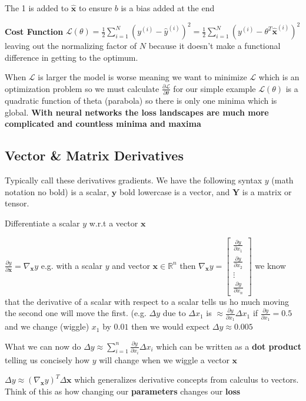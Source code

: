 \documentclass[twocolumn, letter, 10pt, landscape]{article}
\begin{document}
The 1 is added to $\hat{\mathbf{x}}$ to ensure $b$ is a bias added at the end

\textbf{Cost Function}
$\mathcal{L}(\theta) = \frac{1}{2}\sum_{i=1}^N(y^{(i)}-\hat{y}^{(i)})^2 = \frac{1}{2}\sum_{i=1}^N(y^{(i)}-\theta^T\hat{\mathbf{x}}^{(i)})^2$ leaving out the normalizing factor of $N$ because it doesn't make a functional difference in getting to the optimum.

When $\mathcal{L}$ is larger the model is worse meaning we want to minimize $\mathcal{L}$ which is an optimization problem so we must calculate $\frac{\partial\mathcal{L}}{\partial\theta}$ for our simple example $\mathcal{L}(\theta)$ is a quadratic function of theta (parabola) so there is only one minima which is global. \textbf{With neural networks the loss landscapes are much more complicated and countless minima and maxima}

\subsection{Vector \& Matrix Derivatives}
Typically call these derivatives gradients. We have the following syntax $y$ (math notation no bold) is a scalar, $\mathbf{y}$ bold lowercase is a vector, and $\mathbf{Y}$ is a matrix or tensor.

Differentiate a scalar $y$ w.r.t a vector $\mathbf{x}$

$\frac{\partial y}{\partial \mathbf{x}} = \nabla_{\mathbf{x}}y$ e.g. with a scalar $y$ and vector $\mathbf{x} \in \mathbb{R}^n$ then $\nabla_{\mathbf{x}}y = \begin{bmatrix} \frac{\partial y}{\partial x_1} \\ \frac{\partial y}{\partial x_2} \\ \vdots \\ \frac{\partial y}{\partial x_n} \end{bmatrix}$ we know that the derivative of a scalar with respect to a scalar tells us ho much moving the second one will move the first. (e.g. $\Delta y$ due to $\Delta x_1$ is $\approx \frac{\partial y}{\partial x_1}\Delta x_1$ if $\frac{\partial y}{\partial x_1} = 0.5$ and we change (wiggle) $x_1$ by $0.01$ then we would expect $\Delta y \approx 0.005$

What we can now do $\Delta y \approx \sum_{i=1}^n\frac{\partial y}{\partial x_i}\Delta x_i$ which can be written as a \textbf{dot product} telling us concisely how $y$ will change when we wiggle a vector $\mathbf{x}$

$\Delta y \approx (\nabla_{\mathbf{x}}y)^T\Delta\mathbf{x}$ which generalizes derivative concepts from calculus to vectors. Think of this as how changing our \textbf{parameters} changes our \textbf{loss}
\end{document}
